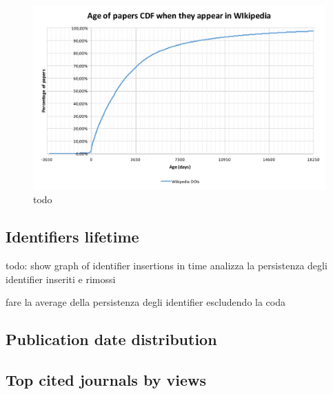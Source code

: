 \begin{figure}[h]
\centering
\includegraphics[keepaspectratio=true, width=\textwidth]{assets/age_of_papers_at_first_appearance_cdf}
\caption{todo}
\label{fig:age_of_papers_at_first_appearance_cdf}
\end{figure}

\subsection{Identifiers lifetime}
todo: show graph of identifier insertions in time
analizza la persistenza degli identifier inseriti e rimossi

fare la average della persistenza degli identifier escludendo la coda
\subsection{Publication date distribution}
\subsection{Top cited journals by views}

